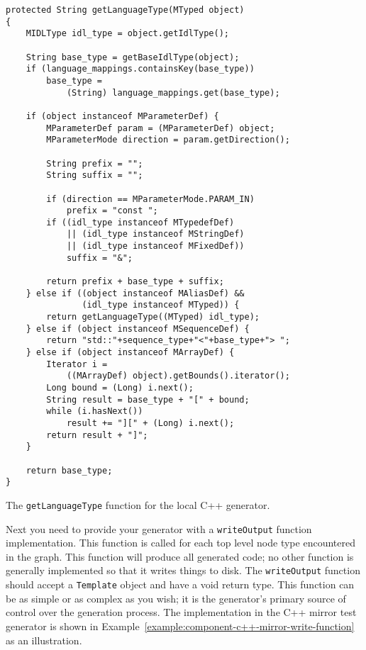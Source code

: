 \begin{Example}
\begin{minifbox}
\begin{small}
\begin{verbatim}
protected String getLanguageType(MTyped object)
{
    MIDLType idl_type = object.getIdlType();

    String base_type = getBaseIdlType(object);
    if (language_mappings.containsKey(base_type))
        base_type =
            (String) language_mappings.get(base_type);

    if (object instanceof MParameterDef) {
        MParameterDef param = (MParameterDef) object;
        MParameterMode direction = param.getDirection();

        String prefix = "";
        String suffix = "";

        if (direction == MParameterMode.PARAM_IN)
            prefix = "const ";
        if ((idl_type instanceof MTypedefDef)
            || (idl_type instanceof MStringDef)
            || (idl_type instanceof MFixedDef))
            suffix = "&";

        return prefix + base_type + suffix;
    } else if ((object instanceof MAliasDef) &&
               (idl_type instanceof MTyped)) {
        return getLanguageType((MTyped) idl_type);
    } else if (object instanceof MSequenceDef) {
        return "std::"+sequence_type+"<"+base_type+"> ";
    } else if (object instanceof MArrayDef) {
        Iterator i =
            ((MArrayDef) object).getBounds().iterator();
        Long bound = (Long) i.next();
        String result = base_type + "[" + bound;
        while (i.hasNext())
            result += "][" + (Long) i.next();
        return result + "]";
    }

    return base_type;
}
\end{verbatim}
\end{small}
\end{minifbox}
\caption{The {\tt getLanguageType} function for the local C++ generator.}
\label{example:component-c++-type-function}
\end{Example}

Next you need to provide your generator with a {\tt writeOutput} function
implementation. This function is called for each top level node type encountered
in the graph. This function will produce all generated code; no other function
is generally implemented so that it writes things to disk. The {\tt writeOutput}
function should accept a {\tt Template} object and have a void return type. This
function can be as simple or as complex as you wish; it is the generator's
primary source of control over the generation process. The implementation in the
C++ mirror test generator is shown in
Example~\ref{example:component-c++-mirror-write-function} as an illustration.

